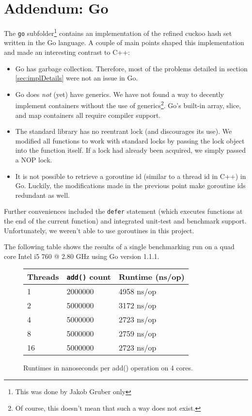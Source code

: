 \documentclass[a4paper,10pt]{article}
\begin{document}
\section{Addendum: Go}

The \verb|go| subfolder\footnote{This was done by Jakob Gruber only} contains an implementation of the refined cuckoo hash set
written in the Go language. A couple of main points shaped this implementation
and made an interesting contrast to C++:

\begin{itemize}
\item Go has garbage collection. Therefore, most of the problems detailed in
    section \ref{sec:implDetails} were not an issue in Go.
\item Go does \emph{not} (yet) have generics. We have not found a way to
    decently implement containers without the use of generics\footnote{Of
    course, this doesn't mean that such a way does not exist.}. Go's built-in
    array, slice, and map containers all require compiler support.
\item The standard library has no reentrant lock (and discourages its use).
    We modified all functions to work with standard locks by passing the
    lock object into the function itself. If a lock had already been acquired,
    we simply passed a NOP lock.
\item It is not possible to retrieve a goroutine id (similar to a thread id in
    C++) in Go. Luckily, the modifications made in the previous point make
    goroutine ids redundant as well.
\end{itemize}

Further conveniences included the \lstinline|defer| statement (which executes
functions at the end of the current function) and integrated unit-test and
benchmark support. Unfortunately, we weren't able to use goroutines in this
project.

The following table shows the results of a single benchmarking run on a
quad core Intel i5 760 @ 2.80 GHz using Go version 1.1.1.

\begin{figure}[H]
\centering
\begin{tabular}{lll}
\toprule
Threads & \lstinline|add()| count & Runtime (ns/op) \\
\midrule
1  &   2000000 &            4958 ns/op \\
2  &   5000000 &            3172 ns/op \\
4  &   5000000 &            2723 ns/op \\
8  &   5000000 &            2759 ns/op \\
16 &   5000000 &            2723 ns/op \\
\bottomrule
\end{tabular}
\caption{Runtimes in nanoseconds per add() operation on 4 cores.}
\label{fig:go}
\end{figure}
\end{document}
